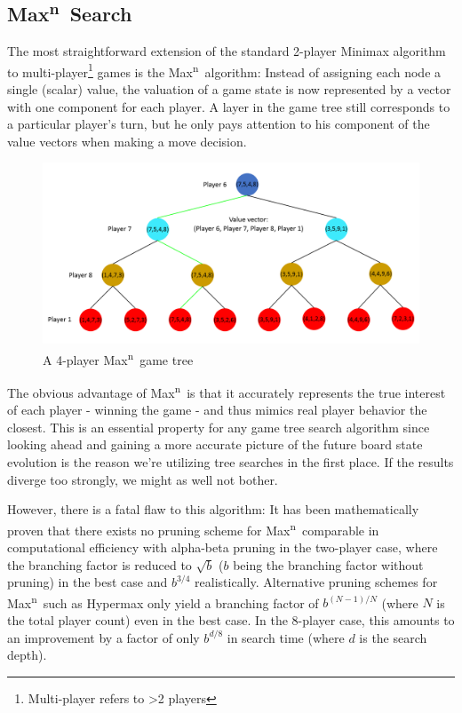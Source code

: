 \documentclass[a4paper,12pt]{article}
\newcommand{\Maxn}{Max\textsuperscript{n}\ }
\begin{document}
    \subsection{\texorpdfstring{\Maxn Search}{Max\textasciicircum n Search}}
    The most straightforward extension of the standard 2-player Minimax algorithm to multi-player\footnote{Multi-player refers to >2 players} games is the \Maxn algorithm: Instead of assigning each node a single (scalar) value, the valuation of a game state is now represented by a vector with one component for each player. A layer in the game tree still corresponds to a particular player's turn, but he only pays attention to his component of the value vectors when making a move decision.
    
    \begin{figure}[H]
        \centering
        \includegraphics[width=\textwidth,keepaspectratio]{pictures/assignment3/MaxnTree.png}
        \caption{A 4-player \Maxn game tree}
    \end{figure}
    
    The obvious advantage of \Maxn is that it accurately represents the true interest of each player - winning the game - and thus mimics real player behavior the closest. This is an essential property for any game tree search algorithm since looking ahead and gaining a more accurate picture of the future board state evolution is the reason we're utilizing tree searches in the first place. If the results diverge too strongly, we might as well not bother.
    
    However, there is a fatal flaw to this algorithm: It has been mathematically proven \cite{multiplayer-alpha-beta} that there exists no pruning scheme for \Maxn comparable in computational efficiency with alpha-beta pruning in the two-player case, where the branching factor is reduced to $\sqrt{b}$ ($b$ being the branching factor without pruning) in the best case and $b^{3/4}$ realistically. Alternative pruning schemes for \Maxn such as Hypermax \cite{n-person-minimax} only yield a branching factor of $b^{(N-1)/N}$ (where $N$ is the total player count) even in the best case. In the 8-player case, this amounts to an improvement by a factor of only $b^{d/8}$ in search time (where $d$ is the search depth).
    
\end{document}
